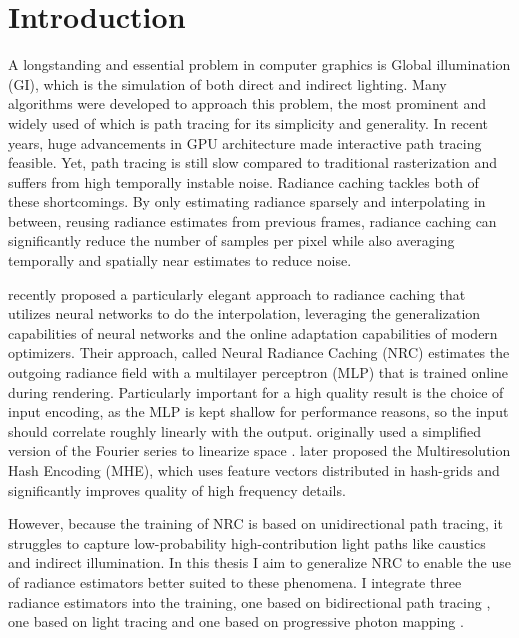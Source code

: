 
\chapter{Introduction}
\label{chap:intro}

A longstanding and essential problem in computer graphics is Global illumination (GI), which is the simulation of both direct and indirect lighting.
Many algorithms were developed to approach this problem, the most prominent and widely used of which is path tracing \parencite{kajiya1986} for its simplicity and generality.
In recent years, huge advancements in GPU architecture made interactive path tracing feasible.
Yet, path tracing is still slow compared to traditional rasterization and suffers from high temporally instable noise.
Radiance caching \parencite{ward1988} tackles both of these shortcomings.
By only estimating radiance sparsely and interpolating in between, reusing radiance estimates from previous frames, radiance caching can significantly reduce the number of samples per pixel while also averaging temporally and spatially near estimates to reduce noise.

\textcite{muller2021} recently proposed a particularly elegant approach to radiance caching that utilizes neural networks to do the interpolation, leveraging the generalization capabilities of neural networks and the online adaptation capabilities of modern optimizers.
Their approach, called Neural Radiance Caching (NRC) estimates the outgoing radiance field with a multilayer perceptron (MLP) that is trained online during rendering.
Particularly important for a high quality result is the choice of input encoding, as the MLP is kept shallow for performance reasons, so the input should correlate roughly linearly with the output.
\textcite{muller2021} originally used a simplified version of the Fourier series to linearize space \parencite{tancik2020}.
\textcite{muller2022} later proposed the Multiresolution Hash Encoding (MHE), which uses feature vectors distributed in hash-grids and significantly improves quality of high frequency details.

However, because the training of NRC is based on unidirectional path tracing, it struggles to capture low-probability high-contribution light paths like caustics and indirect illumination.
In this thesis I aim to generalize NRC to enable the use of radiance estimators better suited to these phenomena.
I integrate three radiance estimators into the training, one based on bidirectional path tracing \parencite{lafortune1993}, one based on light tracing \parencite{arvo1986} and one based on progressive photon mapping \parencite{hachisuka2008}.

